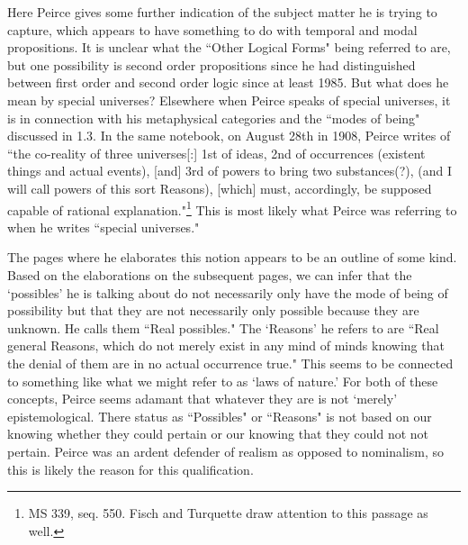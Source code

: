 \documentclass[12pt]{article}
\begin{document}
Here Peirce gives some further indication of the subject matter he is trying to capture, which appears to have something to do with temporal and modal propositions. It is unclear what the ``Other Logical Forms" being referred to are, but one possibility is second order propositions since he had distinguished between first order and second order logic since at least 1985. But what does he mean by special universes? Elsewhere when Peirce speaks of special universes, it is in connection with his metaphysical categories and the ``modes of being" discussed in 1.3. In the same notebook, on August 28th in 1908, Peirce writes of ``the co-reality of three universes[:] 1st of ideas, 2nd of occurrences (existent things and actual events), [and] 3rd of powers to bring two substances(?), (and I will call powers of this sort Reasons), [which] must, accordingly, be supposed capable of rational explanation."\footnote{MS 339, seq. 550. Fisch and Turquette draw attention to this passage as well.} This is most likely what Peirce was referring to when he writes ``special universes."

The pages where he elaborates this notion appears to be an outline of some kind. Based on the elaborations on the subsequent pages, we can infer that the `possibles' he is talking about do not necessarily only have the mode of being of possibility but that they are not necessarily only possible because they are unknown. He calls them ``Real possibles." The `Reasons' he refers to are ``Real general Reasons, which do not merely exist in any mind of minds knowing that the denial of them are in no actual occurrence true." This seems to be connected to something like what we might refer to as `laws of nature.' For both of these concepts, Peirce seems adamant that whatever they are is not `merely' epistemological. There status as ``Possibles" or ``Reasons" is not based on our knowing whether they could pertain or our knowing that they could not not pertain. Peirce was an ardent defender of realism as opposed to nominalism, so this is likely the reason for this qualification.
\end{document}
